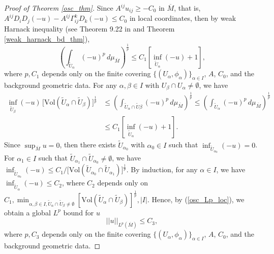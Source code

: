 \documentclass[12pt]{amsart}
\theoremstyle{definition}
\theoremstyle{remark}
\numberwithin{equation}{section}
\begin{document}
\begin{proof}[Proof of Theorem \ref{osc_thm}]
	
	Since $A^{ij}u_{ij} \geq - C_0$ in $\overline{M}$, that is, $A^{ij} D_i D_j (-u) - A^{ij}\Gamma^k_{ij} D_k(-u) \leq C_0$ in local coordinates, then by weak Harnack inequality (see Theorem 9.22 in \cite{GT} and Theorem \ref{weak_harnack_bd_thm}), 
	\begin{equation}\label{osc_Lp_loc}
	\left( \int_{\tilde{U}_\alpha} (-u)^p\, d\mu_{\overline{M}} \right)^{\frac{1}{p}} \leq C_1 \left[ \inf_{\tilde{U}_\alpha} (-u) + 1 \right],
	\end{equation}
	where $p, C_1$ depends only on the finite covering $\{(U_\alpha, \phi_\alpha)\}_{\alpha\in I}$, $A$, $C_0$, and the background geometric data. For any $\alpha, \beta \in I$ with $U_\beta \cap U_\alpha \ne \emptyset$, we have
	\begin{equation}
	\begin{aligned}
	\inf_{\tilde{U}_\beta} (-u)\, \big[\text{Vol} (\tilde{U}_\alpha \cap \tilde{U}_\beta)\big]^{\frac{1}{p}} 
	&\leq \left( \int_{\tilde{U}_\alpha \cap \tilde{U}\beta} (-u)^p\, d\mu_{\overline{M}} \right)^{\frac{1}{p}} \leq \left( \int_{\tilde{U}_\alpha} (-u)^p\, d\mu_{\overline{M}} \right)^{\frac{1}{p}} \\
	&\leq C_1 \left[ \inf_{\tilde{U}_\alpha} (-u) + 1 \right].
	\end{aligned}
	\end{equation}
	Since $\sup_{\overline{M}} u = 0$, then there exists $\tilde{U}_{\alpha_0}$ with $\alpha_0 \in I$ such that $\inf_{\tilde{U}_{\alpha_0}} (-u) = 0$. For $\alpha_1 \in I$ such that $\tilde{U}_{\alpha_1} \cap \tilde{U}_{\alpha_0} \neq \emptyset$, we have $\inf_{\tilde{U}_{\alpha_0}} (-u) \leq C_1 / \big[\text{Vol} (\tilde{U}_{\alpha_0} \cap \tilde{U}_{\alpha_1})\big]^{\frac{1}{p}}$. By induction, for any $\alpha \in I$, we have $\inf_{\tilde{U}_\alpha} (-u) \leq C_2$, where $C_2$ depends only on $C_1, \min_{\alpha, \beta \in I, \tilde{U}_\alpha \cap \tilde{U}_\beta\neq\emptyset}[\text{Vol} (\tilde{U}_\alpha \cap \tilde{U}_\beta)]^{\frac{1}{p}}, |I|$. Hence, by (\ref{osc_Lp_loc}), we obtain a global $L^p$ bound for $u$ 
	\begin{equation}\label{osc_Lp_global}
	||u||_{L^p(\overline{M})} \leq C_3,
	\end{equation}
	where $p, C_3$ depends only on the finite covering $\{(U_\alpha, \phi_\alpha)\}_{\alpha\in I}$, $A$, $C_0$, and the background geometric data.
	

\end{proof}
\end{document}
